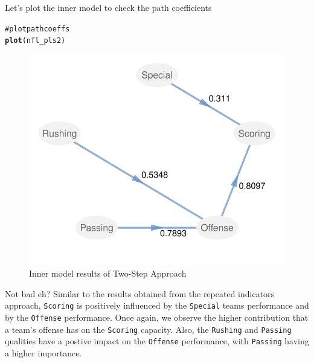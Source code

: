 \documentclass[12pt]{book}\usepackage{graphicx, color}
\makeatletter
\newcommand{\hlfunctioncall}[1]{\textcolor[rgb]{0.501960784313725,0,0.329411764705882}{\textbf{#1}}}%
\newcommand{\hlcomment}[1]{\textcolor[rgb]{0.180392156862745,0.6,0.341176470588235}{#1}}%
\newenvironment{kframe}{%
 \def\at@end@of@kframe{}%
 \ifinner\ifhmode%
  \def\at@end@of@kframe{\end{minipage}}%
  \begin{minipage}{\columnwidth}%
 \fi\fi%
 \def\FrameCommand##1{\hskip\@totalleftmargin \hskip-\fboxsep
 \colorbox{shadecolor}{##1}\hskip-\fboxsep
     \hskip-\linewidth \hskip-\@totalleftmargin \hskip\columnwidth}%
 \MakeFramed {\advance\hsize-\width
   \@totalleftmargin\z@ \linewidth\hsize
   \@setminipage}}%
 {\par\unskip\endMakeFramed%
 \at@end@of@kframe}
\newenvironment{knitrout}{}{} %
\newcommand{\code}[1]{\texttt{#1}}
\makeatother
\begin{document}
Let's plot the inner model to check the path coefficients
\begin{knitrout}
\color{fgcolor}\begin{kframe}
\begin{alltt}
\hlcomment{# plot path coeffs}
\hlfunctioncall{plot}(nfl_pls2)
\end{alltt}
\end{kframe}\begin{figure}[h]


{\centering \includegraphics[width=.75\linewidth,height=.45\linewidth]{figure/nlf_patchy_path_coeff} 

}

\caption[Inner model results of Two-Step Approach]{Inner model results of Two-Step Approach\label{fig:nlf_patchy_path_coeff}}
\end{figure}


\end{knitrout}


Not bad eh? Similar to the results obtained from the repeated indicators approach, \code{Scoring} is positively influenced by the \code{Special} teams performance and by the \code{Offense} performance. Once again, we observe the higher contribution that a team's offense has on the \code{Scoring} capacity. Also, the \code{Rushing} and \code{Passing} qualities have a postive impact on the \code{Offense} performance, with \code{Passing} having a higher importance.
\end{document}
